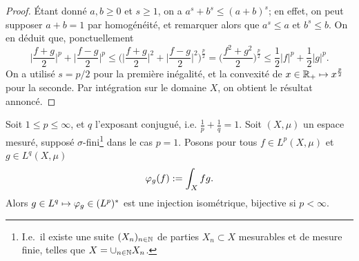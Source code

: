 \begin{proof}
Étant donné $a,b\geq 0$ et $s\geq 1$, on a $a^s+b^s\leq (a+b)^s$; en effet, on peut supposer $a+b=1$ par homogénéité, et remarquer alors que $a^s \leq a$ et $b^s\leq b$. On en déduit que, ponctuellement
\begin{equation*}
	\big|\frac{f+g} 2\big|^p + \big|\frac{f-g} 2\big|^p \leq \Big(\big|\frac{f+g} 2\big|^2 + \big|\frac{f-g} 2\big|^2\Big)^\frac p 2 = \big(\frac{f^2+g^2} 2\big)^\frac p 2 \leq \frac 1 2 |f|^p + \frac 1 2 |g|^p.
\end{equation*}
	On a utilisé $s=p/2$ pour la première inégalité, et la convexité de $x\in \mathbb{R}_+ \mapsto x^\frac p 2$ pour la seconde. 
	Par intégration sur le domaine $X$, on obtient le résultat annoncé.
\end{proof}

\begin{theorem}
\label{th:lpDualLq}
%
Soit $1 \leq p \leq \infty$, et $q$ l'exposant conjugué, i.e. $\frac 1 p + \frac 1 q =1$. 
Soit $(X,\mu)$ un espace mesuré, supposé $\sigma$-fini\footnote{I.e.\ il existe une suite  $(X_n)_{n\in \mathbb{N}}$ de parties $X_n\subset X$ mesurables et de mesure finie, telles que $X = \cup_{n\in \mathbb{N}} X_n$.} dans le cas $p=1$.
Posons pour tous $f\in L^p(X,\mu)$ et $g \in L^q(X,\mu)$
\begin{equation*}
	\varphi_g(f) := \int_X fg.
\end{equation*}
Alors $g\in L^q \mapsto \varphi_g \in (L^p)^*$ est une injection isométrique, bijective si $p<\infty$. 
\end{theorem}

